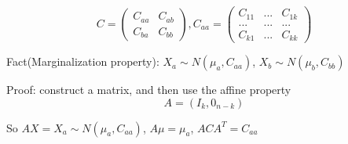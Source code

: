 \documentclass[12pt]{article}
\begin{document}
\begin{equation}
    C=\begin{pmatrix}
        C_{aa} & C_{ab} \\
        C_{ba} & C_{bb}
    \end{pmatrix}
,
    C_{aa}=\begin{pmatrix}
        C_{11} & ... & C_{1k} \\
        ... & ... & ... \\
        C_{k1} & ... & C_{kk}
    \end{pmatrix}
\end{equation}

Fact(Marginalization property): 
$X_a\sim N(\mu_a, C_{aa})$,
$X_b\sim N(\mu_b, C_{bb})$

Proof: construct a matrix, and then use the affine property
\begin{equation}
    A=(I_k, 0_{n-k})
\end{equation}

So $AX=X_a\sim N(\mu_a, C_{aa})$, $A\mu=\mu_a$, $ACA^T=C_{aa}$
\end{document}
